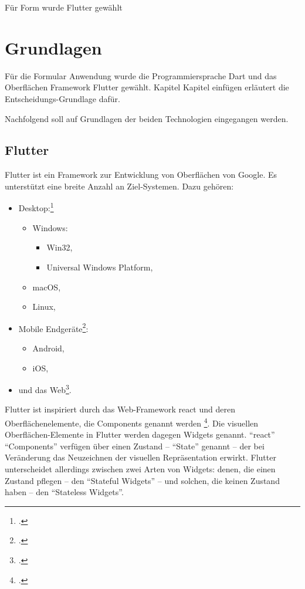 
Für Form wurde Flutter gewählt

\section{Grundlagen}

Für die Formular Anwendung wurde die Programmiersprache Dart und das Oberflächen Framework Flutter gewählt. Kapitel Kapitel einfügen  erläutert die Entscheidungs-Grundlage dafür.

Nachfolgend soll auf  Grundlagen der beiden Technologien eingegangen werden.

\subsection{Flutter}

Flutter ist ein Framework zur Entwicklung von Oberflächen von Google.
Es unterstützt eine breite Anzahl an Ziel-Systemen.  Dazu gehören:

\begin{itemize}
  \item Desktop:\footcite[Vgl.][]{DesktopSupportForFlutter}
        \begin{itemize}
          \item Windows:
                \begin{itemize}
                  \item Win32,
                  \item Universal Windows Platform,
                \end{itemize}
          \item macOS,
          \item Linux,
        \end{itemize}
  \item Mobile Endgeräte\footcite[Vgl.][]{FlutterBeautifulNativeAppsInRecordTime}:
        \begin{itemize}
          \item Android,
          \item iOS,
        \end{itemize}
  \item und das Web\footcite[Vgl.][]{WebSupportForFlutter}.
\end{itemize}

Flutter ist inspiriert durch das Web-Framework react und deren Oberflächenelemente, die Components genannt werden \footcite[Vgl.][]{IntroductionToWidgets}. Die visuellen Oberflächen-Elemente in Flutter werden dagegen Widgets genannt. \enquote{react} \enquote{Components} verfügen über einen Zustand – \enquote{State} genannt – der bei Veränderung das Neuzeichnen der visuellen Repräsentation erwirkt. Flutter unterscheidet allerdings zwischen zwei Arten von Widgets: denen, die einen Zustand pflegen – den \enquote{Stateful Widgets} – und solchen, die keinen Zustand haben – den \enquote{Stateless Widgets}.

